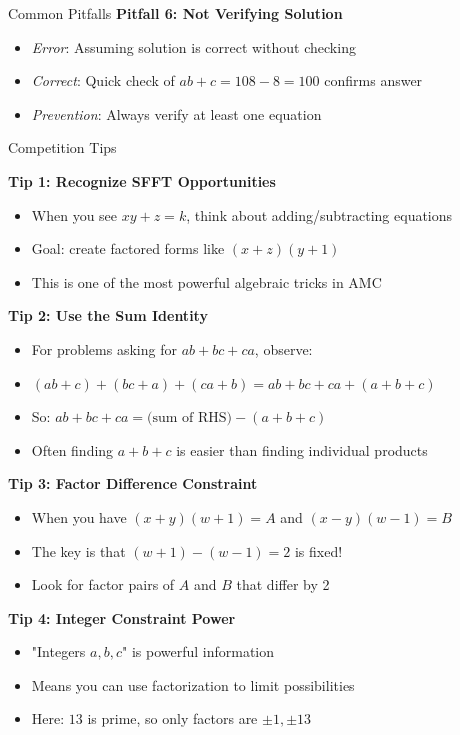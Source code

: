 \documentclass[12pt]{article}
\begin{document}
\begin{warningbox}{Common Pitfalls}
\textbf{Pitfall 6: Not Verifying Solution}
\begin{itemize}
    \item \textit{Error}: Assuming solution is correct without checking
    \item \textit{Correct}: Quick check of $ab + c = 108 - 8 = 100$ confirms answer
    \item \textit{Prevention}: Always verify at least one equation
\end{itemize}

\end{warningbox}

\begin{protipbox}{Competition Tips}

\textbf{Tip 1: Recognize SFFT Opportunities}
\begin{itemize}
    \item When you see $xy + z = k$, think about adding/subtracting equations
    \item Goal: create factored forms like $(x+z)(y+1)$
    \item This is one of the most powerful algebraic tricks in AMC
\end{itemize}

\textbf{Tip 2: Use the Sum Identity}
\begin{itemize}
    \item For problems asking for $ab + bc + ca$, observe:
    \item $(ab+c) + (bc+a) + (ca+b) = ab + bc + ca + (a+b+c)$
    \item So: $ab + bc + ca = \text{(sum of RHS)} - (a+b+c)$
    \item Often finding $a+b+c$ is easier than finding individual products
\end{itemize}

\textbf{Tip 3: Factor Difference Constraint}
\begin{itemize}
    \item When you have $(x+y)(w+1) = A$ and $(x-y)(w-1) = B$
    \item The key is that $(w+1) - (w-1) = 2$ is fixed!
    \item Look for factor pairs of $A$ and $B$ that differ by 2
\end{itemize}

\textbf{Tip 4: Integer Constraint Power}
\begin{itemize}
    \item "Integers $a, b, c$" is powerful information
    \item Means you can use factorization to limit possibilities
    \item Here: $13$ is prime, so only factors are $\pm 1, \pm 13$
\end{itemize}


\end{protipbox}
\end{document}
